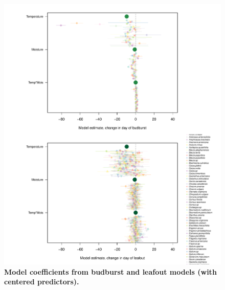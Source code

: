 \documentclass{article}
\begin{document}
\begin{figure}[h]
\centering
 \includegraphics{../../Analyses/soilmoisture/figures/m5.bbdlo.pdf}
 \caption{\textbf{Model coefficients from budburst and leafout models (with centered predictors).}} 
 \label{fig:bblo}
 \end{figure}
 
\end{document}
